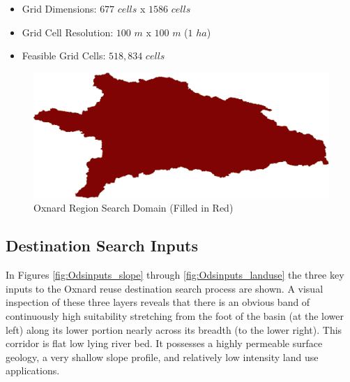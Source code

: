     \begin{itemize}
      \setlength{\itemsep}{0cm}
      \setlength{\parskip}{0cm}
        \item Grid Dimensions: $677$ $cells$ x $1586$ $cells$
        \item Grid Cell Resolution: $100$ $m$ x $100$ $m$ ($1$ $ha$)
        \item Feasible Grid Cells: $518,834$ $cells$
    \end{itemize}
    
        \begin{figure}[!h]
            \begin{center}
            \includegraphics[width=5.5in]{figures/Oxnard_SearchDomain.png}   
            \caption{Oxnard Region Search Domain (Filled in Red)}
            \label{fig:Odomain}
            \end{center}
        \end{figure}
        
    \subsection{Destination Search Inputs}
    
In Figures \ref{fig:Odsinputs_slope} through \ref{fig:Odsinputs_landuse} the three key inputs to the Oxnard reuse destination search process are shown. A visual inspection of these three layers reveals that there is an obvious band of continuously high suitability stretching from the foot of the basin (at the lower left) along its lower portion nearly across its breadth (to the lower right). This corridor is flat low lying river bed. It possesses a highly permeable surface geology, a very shallow slope profile, and relatively low intensity land use applications. 
    
